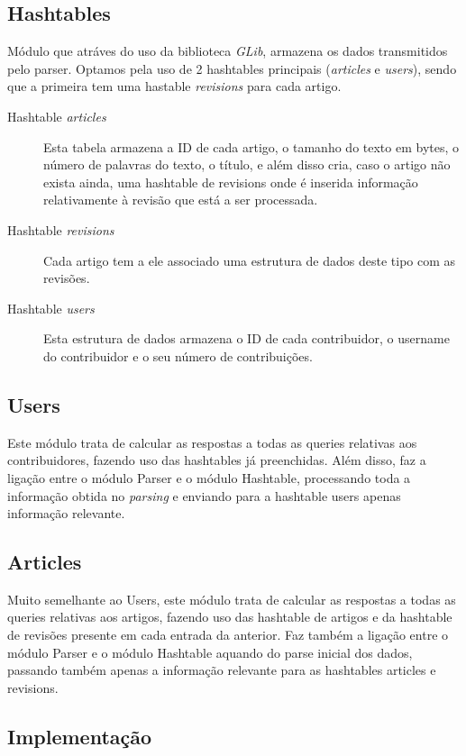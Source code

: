 \documentclass[a4paper]{article}
\begin{document}
\subsection{Hashtables}
Módulo que atráves do uso da biblioteca \textit{GLib}, armazena os dados transmitidos pelo parser. Optamos pela uso de 2 hashtables principais (\textit{articles} e \textit{users}), sendo que a primeira tem uma hastable \textit{revisions} para cada artigo.
\begin{description}
    \item[Hashtable \textit{articles}] Esta tabela armazena a ID de cada artigo, o tamanho do texto em bytes, o número de palavras do texto, o título, e além disso cria, caso o artigo não exista ainda, uma hashtable de revisions onde é inserida informação relativamente à revisão que está a ser processada.

    \item[Hashtable \textit{revisions}] Cada artigo tem a ele associado uma estrutura de dados deste tipo com as revisões.

    \item[Hashtable \textit{users}] Esta estrutura de dados armazena o ID de cada contribuidor, o username do contribuidor e o seu número de contribuições.

\end{description}

\subsection{Users}
 Este módulo trata de calcular as respostas a todas as queries relativas aos contribuidores, fazendo uso das hashtables já preenchidas. Além disso, faz a ligação entre o módulo Parser e o módulo Hashtable, processando toda a informação obtida no \textit{parsing} e enviando para a hashtable users apenas informação relevante.

\subsection{Articles}
 Muito semelhante ao Users, este módulo trata de calcular as respostas a todas as queries relativas aos artigos, fazendo uso das hashtable de artigos e da hashtable de revisões presente em cada entrada da anterior. Faz também a ligação entre o módulo Parser e o módulo Hashtable aquando do parse inicial dos dados, passando também apenas a informação relevante para as hashtables articles e revisions.

\subsection{Implementação}
\end{document}
